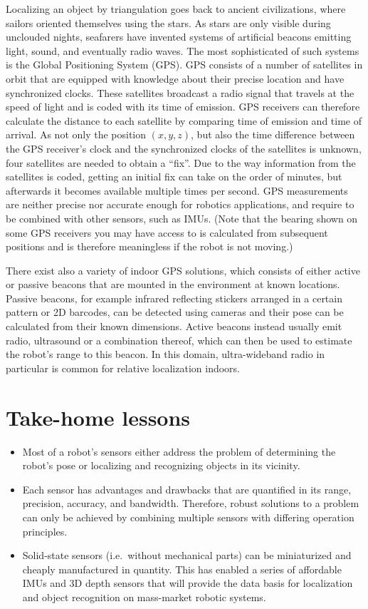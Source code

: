 Localizing an object by triangulation goes back to ancient civilizations, where sailors oriented themselves using the stars. As stars are only visible during unclouded nights, seafarers have invented systems of artificial beacons emitting light, sound, and eventually radio waves. The most sophisticated of such systems is the Global Positioning System (GPS). GPS consists of a number of satellites in orbit that are equipped with knowledge about their precise location and have synchronized clocks. These satellites broadcast a radio signal that travels at the speed of light and is coded with its time of emission. GPS receivers can therefore calculate the distance to each satellite by comparing time of emission and time of arrival. As not only the position $(x,y,z)$, but also the time difference between the GPS receiver's clock and the synchronized clocks of the satellites is unknown, four satellites are needed to obtain a ``fix''. Due to the way information from the satellites is coded, getting an initial fix can take on the order of minutes, but afterwards it becomes available multiple times per second. GPS measurements are neither precise nor accurate enough for robotics applications, and require to be combined with other sensors, such as IMUs. (Note that the bearing shown on some GPS receivers you may have access to is calculated from subsequent positions and is therefore meaningless if the robot is not moving.)

There exist also a variety of indoor GPS solutions, which consists of either active or passive beacons that are mounted in the environment at known locations. Passive beacons, for example infrared reflecting stickers arranged in a certain pattern or 2D barcodes, can be detected using cameras and their pose can be calculated from their known dimensions. Active beacons instead usually emit radio, ultrasound or a combination thereof, which can then be used to estimate the robot's range to this beacon. In this domain, ultra-wideband radio in particular is common for relative localization indoors.

\section*{Take-home lessons}
\begin{itemize}
\item Most of a robot's sensors either address the problem of determining the robot's pose or localizing and recognizing objects in its vicinity.
\item Each sensor has advantages and drawbacks that are quantified in its range, precision, accuracy, and bandwidth. Therefore, robust solutions to a problem can only be achieved by combining multiple sensors with differing operation principles.
\item Solid-state sensors (i.e.\ without mechanical parts) can be miniaturized and cheaply manufactured in quantity. This has enabled a series of affordable IMUs and 3D depth sensors that will provide the data basis for localization and object recognition on mass-market robotic systems.
\end{itemize}

